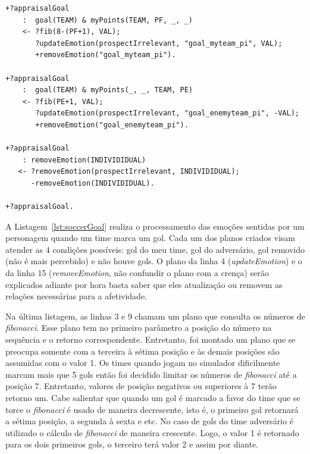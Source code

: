\begin{center}
    \begin{minipage}{120mm}
	\lstset{linewidth=120mm}
	\begin{lstlisting}[frame=trbl,
caption=Parte do código do agente referente à avaliação de gol,
label=lst:soccerGoal]
+?appraisalGoal
    :  goal(TEAM) & myPoints(TEAM, PF, _, _)
    <- ?fib(8-(PF+1), VAL);
       ?updateEmotion(prospectIrrelevant, "goal_myteam_pi", VAL);
       +removeEmotion("goal_myteam_pi").

+?appraisalGoal
    :  goal(TEAM) & myPoints(_, _, TEAM, PE)
    <- ?fib(PE+1, VAL);
       ?updateEmotion(prospectIrrelevant, "goal_enemyteam_pi", -VAL);
       +removeEmotion("goal_enemyteam_pi").

+?appraisalGoal
    : removeEmotion(INDIVIDIDUAL)
   <- ?removeEmotion(prospectIrrelevant, INDIVIDIDUAL);
      -removeEmotion(INDIVIDIDUAL).

+?appraisalGoal.
	\end{lstlisting}
    \end{minipage}
\end{center}

A Listagem~\ref{lst:soccerGoal} realiza o processamento das emoções sentidas
por um personagem quando um time marca um gol. Cada um dos planos criados
visam atender as 4 condições possíveis: gol do meu time, gol do adversário,
gol removido (não é mais percebido) e não houve gols. O plano da
linha 4 (\emph{updateEmotion}) e o da linha 15 (\emph{removeEmotion}, não
confundir o plano com a crença) serão explicados adiante por hora basta saber
que eles atualização ou removem as relações necessárias para a afetividade.

Na última listagem, as linhas 3 e 9 chamam um plano que consulta os números de
\emph{fibonacci}. Esse plano tem no primeiro parâmetro a posição do número na
sequência e o retorno correspondente. Entretanto, foi montado um plano que se
preocupa somente com a terceira à sétima posição e às demais posições são
assumidas com o valor 1. Os times quando jogam no simulador dificilmente
marcam mais que 5 gols então foi decidido limitar os números de
\emph{fibonacci} até a posição 7. Entretanto, valores de posição negativos ou
superiores à 7 terão retorno um. Cabe salientar que quando um gol é marcado
a favor do time que se torce o \emph{fibonacci} é usado de maneira
decrescente, isto é, o primeiro gol retornará a sétima posição, a segunda à
sexta e etc. No caso de gols do time adversário é utilizado o cálculo de
\emph{fibonacci} de maneira crescente. Logo, o valor 1 é retornado para os
dois primeiros gols, o terceiro terá valor 2 e assim por diante.


